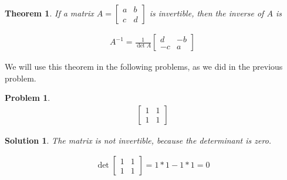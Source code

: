 \documentclass{article}
\newtheorem{theorem}{Theorem}
\newtheorem{problem}{Problem}
\newtheorem*{solution}{Solution}
\begin{document}
\begin{theorem}
If a matrix $A = \begin{bmatrix} a & b \\ c & d \end{bmatrix}$ is invertible, then the inverse of $A$ is

\begin{align*}
A^{-1} = \displaystyle \frac{1}{\det A} \begin{bmatrix} d & -b \\ -c & a \end{bmatrix}
\end{align*}
\end{theorem}

We will use this theorem in the following problems, as we did in the previous problem.

\begin{problem}
\begin{align*}
\begin{bmatrix}
1 & 1 \\ 1 & 1
\end{bmatrix}
\end{align*}
\end{problem}

\begin{solution}
The matrix is not invertible, because the determinant is zero.

\begin{align*}
\det \begin{bmatrix}1 & 1 \\ 1 & 1\end{bmatrix} = 1*1 - 1*1 = 0
\end{align*}

\end{solution}
\end{document}
